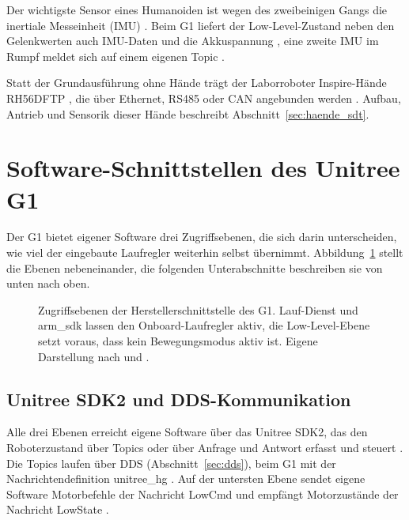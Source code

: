 Der wichtigste Sensor eines Humanoiden ist wegen des zweibeinigen Gangs die inertiale Messeinheit (IMU) \cite{Saeedvand2019}.
Beim G1 liefert der Low-Level-Zustand neben den Gelenkwerten auch IMU-Daten und die Akkuspannung \cite{UnitreeSDK2Py}, eine zweite IMU im Rumpf meldet sich auf einem eigenen Topic \cite{UnitreeMujoco}.

Statt der Grundausführung ohne Hände trägt der Laborroboter Inspire-Hände RH56DFTP , die über Ethernet, RS485 oder CAN angebunden werden \cite{Inspire2024}.
Aufbau, Antrieb und Sensorik dieser Hände beschreibt Abschnitt~\ref{sec:haende_sdt}.

\section{Software-Schnittstellen des Unitree G1}
\label{sec:g1_software}
Der G1 bietet eigener Software drei Zugriffsebenen, die sich darin unterscheiden, wie viel der eingebaute Laufregler weiterhin selbst übernimmt.
Abbildung~\ref{fig:g1_schnittstellen} stellt die Ebenen nebeneinander, die folgenden Unterabschnitte beschreiben sie von unten nach oben.

\begin{figure}[htbp]
  \centering
  
  \caption[Zugriffsebenen der Herstellerschnittstelle des G1]{Zugriffsebenen der Herstellerschnittstelle des G1. Lauf-Dienst und arm\_sdk lassen den Onboard-Laufregler aktiv, die Low-Level-Ebene setzt voraus, dass kein Bewegungsmodus aktiv ist. Eigene Darstellung nach  und \cite{Hu2026}.}
  \label{fig:g1_schnittstellen}
\end{figure}

\subsection{Unitree SDK2 und DDS-Kommunikation}
\label{sec:g1_sdk}
Alle drei Ebenen erreicht eigene Software über das Unitree SDK2, das den Roboterzustand über Topics oder über Anfrage und Antwort erfasst und steuert \cite{UnitreeSDK2Py}.
Die Topics laufen über DDS (Abschnitt~\ref{sec:dds}), beim G1 mit der Nachrichtendefinition unitree\_hg \cite{UnitreeMujoco}.
Auf der untersten Ebene sendet eigene Software Motorbefehle der Nachricht LowCmd und empfängt Motorzustände der Nachricht LowState \cite{UnitreeMujoco}.

